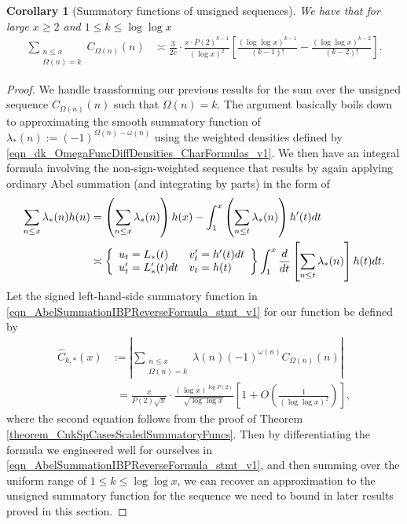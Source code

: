 \documentclass[11pt,reqno,a4letter]{article}
\numberwithin{figure}{section}
\numberwithin{table}{section}
\theoremstyle{plain}
\newtheorem{cor}[theorem]{Corollary}
\numberwithin{theorem}{section}
\theoremstyle{definition}
\begin{document}
\begin{cor}[Summatory functions of unsigned sequences] 
\label{cor_SummatoryFuncsOfUnsignedSeqs_v2} 
We have that for large $x \geq 2$ and $1 \leq k \leq \log\log x$ 
\begin{align*} 
\sum_{\substack{n \leq x \\ \Omega(n) = k}} C_{\Omega(n)}(n) & \asymp 
     \frac{3}{2\widehat{c}} \cdot \frac{x \cdot P(2)^{k-1}}{(\log x)^2} \left[ 
     \frac{(\log\log x)^{k-1}}{(k-1)!} - \frac{(\log\log x)^{k-2}}{(k-2)!}\right]. 
\end{align*} 
\end{cor} 
\begin{proof} 
We handle transforming our previous results for the sum over the unsigned sequence 
$C_{\Omega(n)}(n)$ such that $\Omega(n) = k$. 
The argument basically boils down to approximating the smooth summatory function of 
$\lambda_{\ast}(n) := (-1)^{\Omega(n) - \omega(n)}$ using the weighted 
densities defined by \eqref{eqn_dk_OmegaFuncDiffDensities_CharFormulas_v1}. 
We then have an integral formula involving the non-sign-weighted 
sequence that results by again 
applying ordinary Abel summation (and integrating by parts) in the form of 
\begin{align} 
\label{eqn_AbelSummationIBPReverseFormula_stmt_v1} 
\sum_{n \leq x} \lambda_{\ast}(n) h(n) & = \left(\sum_{n \leq x} \lambda_{\ast}(n)\right) h(x) - 
     \int_{1}^{x} \left(\sum_{n \leq t} \lambda_{\ast}(n)\right) h^{\prime}(t) dt \\ 
\notag 
     & \asymp \left\{\begin{array}{ll} 
     u_t = L_{\ast}(t) & v_t^{\prime} = h^{\prime}(t) dt \\ 
     u_t^{\prime} = L_{\ast}^{\prime}(t) dt & v_t = h(t) 
     \end{array} 
     \right\} 
     \int_1^{x} \frac{d}{dt}\left[\sum_{n \leq t} \lambda_{\ast}(n)\right] h(t) dt. 
\end{align} 
Let the signed left-hand-side summatory function in 
\eqref{eqn_AbelSummationIBPReverseFormula_stmt_v1} for our function be defined by 
\begin{align*} 
\widehat{C}_{k,\ast}(x) & := \left\lvert \sum_{\substack{n \leq x \\ \Omega(n)=k}} 
     \lambda(n) (-1)^{\omega(n)} C_{\Omega(n)}(n) \right\rvert \\ 
     & \phantom{:} = 
     \frac{x}{P(2) \sqrt{x}} \cdot \frac{(\log x)^{\log P(2)}}{\sqrt{\log\log x}} \left[ 
     1 + O\left(\frac{1}{(\log\log x)^2}\right)\right], 
\end{align*} 
where the second equation follows from the proof of 
Theorem \ref{theorem_CnkSpCasesScaledSummatoryFuncs}. 
Then by differentiating the formula we engineered well for ourselves in 
\eqref{eqn_AbelSummationIBPReverseFormula_stmt_v1}, and 
then summing over the uniform range of $1 \leq k \leq \log\log x$, 
we can recover an approximation to the unsigned summatory function for the 
sequence we need to bound in later results proved in this section. 


\end{proof}
\end{document}
